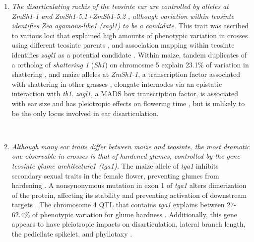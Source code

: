 \documentclass[a4paper]{article}
\newcommand{\mcs}[1]{\todo[size=\tiny, color=magenta!20]{#1}}
\begin{document}
\begin{enumerate}
﻿ \item \textit{The disarticulating rachis of the teosinte ear are controlled by alleles at \textit{ZmSh1-1}%
 and \textit{ZmSh1-5.1+ZmSh1-5.2}%
 , although variation within teosinte identifies \textit{Zea agamous-like1} (\textit{zagl1}) to be a candidate.}
 This trait was ascribed to various loci that explained high amounts of phenotypic variation in crosses using different teosinte parents \citep{doebley1991, doebley1993}, and association mapping within teosinte identifies \textit{zagl1} as a potential candidate \citep{weber2008}. %
Within maize, tandem duplicates of a ortholog of \textit{shattering 1} (\textit{Sh1}) on chromosme 5 explain 23.1\% of variation in shattering \citep{lin2012}, and maize alleles at \textit{ZmSh1-1}, a transcription factor associated with shattering in other grasses \citep{lin2012}, elongate internodes via an epistatic interaction with \textit{tb1}\citep{yang2016}. %
 \textit{zagl1}, a MADS box transcription factor, is associated with ear size and has pleiotropic effects on flowering time \citep{wills2017}, but is unlikely to be the only locus involved in ear disarticulation.

﻿ \item \textit{Although many ear traits differ between maize and teosinte, the most dramatic one observable in crosses is that of hardened glumes, controlled by the gene \textit{teosinte glume architecture1} (\textit{tga1}).}
 The maize allele of \textit{tga1} inhibits secondary sexual traits in the female flower, preventing glumes from hardening \citep{preston2012}.
 A nonsynonymous mutation in exon 1 of \textit{tga1} alters dimerization of the protein, affecting its stability and preventing activation of downstream targets \citep{wang2015}.
 The chromosome 4 QTL that contains \textit{tga1}  explains between 27-62.4\% of phenotypic variation for glume hardness \citep{doebley1991, doebley1993, briggs2007}.
 Additionally, this gene appears to have pleiotropic impacts on disarticulation, lateral branch length, the pedicilate spikelet, and phyllotaxy \citep{wang2015}.


\end{enumerate}
\end{document}
